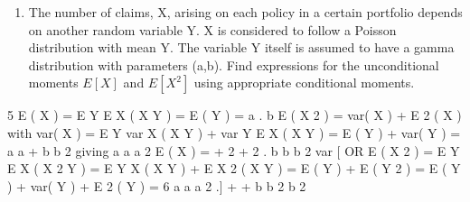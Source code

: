 \documentclass[a4paper,12pt]{article}
\begin{document}
\begin{enumerate}

\item The number of claims, X, arising on each policy in a certain portfolio depends on another random variable Y. X is considered to follow a Poisson distribution with mean Y. The variable Y itself is assumed to have a gamma distribution with
parameters (a,b).
Find expressions for the unconditional moments $E[X]$ and $E[X^2]$ using appropriate conditional moments.


\end{enumerate}

5
E ( X ) = E Y { E X ( X Y ) } = E ( Y ) =
a
.
b
E ( X 2 ) = var( X ) + E 2 ( X )
with
var( X ) = E Y { var X ( X Y ) } + var Y { E X ( X Y ) }
= E ( Y ) + var( Y ) =
a a
+
b b 2
giving
a a a 2
E ( X ) = + 2 + 2 .
b b
b
2
{
{ var
}
[ OR E ( X 2 ) = E Y E X ( X 2 Y )
= E Y
X
}
( X Y ) + E X 2 ( X Y ) = E ( Y ) + E ( Y 2 )
= E ( Y ) + var( Y ) + E 2 ( Y )
=
6
a a a 2
.]
+ +
b b 2 b 2
\end{document}

